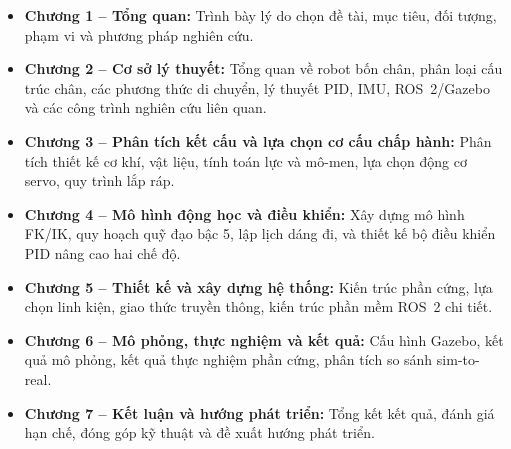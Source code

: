 \begin{itemize}
    \item \textbf{Chương 1 -- Tổng quan:} Trình bày lý do chọn đề tài, mục tiêu, đối tượng, phạm vi và phương pháp nghiên cứu.
    \item \textbf{Chương 2 -- Cơ sở lý thuyết:} Tổng quan về robot bốn chân, phân loại cấu trúc chân, các phương thức di chuyển, lý thuyết PID, IMU, ROS~2/Gazebo và các công trình nghiên cứu liên quan.
    \item \textbf{Chương 3 -- Phân tích kết cấu và lựa chọn cơ cấu chấp hành:} Phân tích thiết kế cơ khí, vật liệu, tính toán lực và mô-men, lựa chọn động cơ servo, quy trình lắp ráp.
    \item \textbf{Chương 4 -- Mô hình động học và điều khiển:} Xây dựng mô hình FK/IK, quy hoạch quỹ đạo bậc 5, lập lịch dáng đi, và thiết kế bộ điều khiển PID nâng cao hai chế độ.
    \item \textbf{Chương 5 -- Thiết kế và xây dựng hệ thống:} Kiến trúc phần cứng, lựa chọn linh kiện, giao thức truyền thông, kiến trúc phần mềm ROS~2 chi tiết.
    \item \textbf{Chương 6 -- Mô phỏng, thực nghiệm và kết quả:} Cấu hình Gazebo, kết quả mô phỏng, kết quả thực nghiệm phần cứng, phân tích so sánh sim-to-real.
    \item \textbf{Chương 7 -- Kết luận và hướng phát triển:} Tổng kết kết quả, đánh giá hạn chế, đóng góp kỹ thuật và đề xuất hướng phát triển.
\end{itemize}